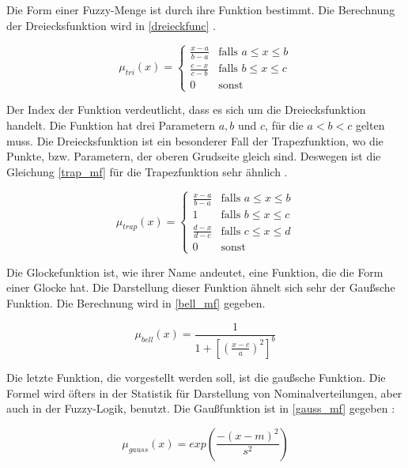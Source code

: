 Die Form einer Fuzzy-Menge ist durch ihre Funktion bestimmt. Die Berechnung der Dreiecksfunktion wird in \ref{dreieckfunc} .

\begin{equation}
\mu_{tri}(x) = \begin{cases}
\frac{x - a}{b - a} & \text{falls $a \leq x \leq b$}\\
\frac{c - x}{c - b} & \text{falls $b \leq x \leq c$}\\
0 & \text{sonst}
\end{cases}\label{dreieckfunc}
\end{equation}

Der Index der Funktion verdeutlicht, dass es sich um die Dreiecksfunktion handelt. Die Funktion hat drei Parametern $a, b$ und $c$, für die $a < b < c$ gelten muss. Die Dreiecksfunktion ist ein besonderer Fall der Trapezfunktion, wo die Punkte, bzw. Parametern, der oberen Grudseite gleich sind. Deswegen ist die Gleichung \ref{trap_mf} für die Trapezfunktion sehr ähnlich \cite{CIKruse:15}.

\begin{equation}
\mu_{trap}(x) = \begin{cases}
\frac{x - a}{b - a} & \text{falls $a \leq x \leq b$}\\
1 & \text{falls $b \leq x \leq c$}\\
\frac{d - x}{d - c} & \text{falls $c \leq x \leq d$}\\
0 & \text{sonst}

\label{trap_mf}
\end{cases}
\end{equation}

Die Glockefunktion ist, wie ihrer Name andeutet, eine Funktion, die die Form einer Glocke hat. Die Darstellung dieser Funktion ähnelt sich sehr der Gaußsche Funktion. Die Berechnung wird in \ref{bell_mf} gegeben. 

\begin{equation}
\mu_{bell}(x) = \frac{1}{1 + [(\frac{x - c}{a})^2]^b}
\label{bell_mf}
\end{equation}

Die letzte Funktion, die vorgestellt werden soll, ist die gaußsche Funktion. Die Formel wird öfters in der Statistik für Darstellung von Nominalverteilungen, aber auch in der Fuzzy-Logik, benutzt. Die Gaußfunktion ist in \ref{gauss_mf} gegeben \cite{CIKruse:15}:

\begin{equation}
\mu_{gauss}(x) = exp(\frac{-(x - m)^2}{s^2})
\label{gauss_mf}
\end{equation}

